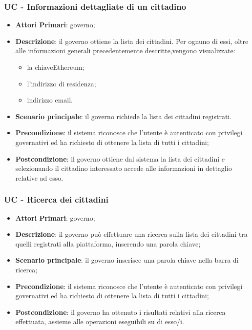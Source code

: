 \subsubsection{UC - Informazioni dettagliate di un cittadino}
\begin{itemize}
	\item \textbf{Attori Primari}: governo;
	\item \textbf{Descrizione}: il governo ottiene la lista dei cittadini. Per ognuno di essi, oltre alle informazioni generali precedentemente descritte,vengono visualizzate:
	\begin{itemize}
		\item la chiave\glosp Ethereum\glo;
		\item l'indirizzo di residenza;
		\item indirizzo email.
	\end{itemize}
	\item \textbf{Scenario principale}: il governo richiede la lista dei cittadini registrati.
	\item \textbf{Precondizione}: il sistema riconosce che l'utente è autenticato con privilegi governativi ed ha richiesto di ottenere la lista di tutti i cittadini;
	\item \textbf{Postcondizione}: il governo ottiene dal sistema la lista dei cittadini e selezionando il cittadino interessato accede alle informazioni in dettaglio relative ad esso.
\end{itemize}

\subsubsection{UC - Ricerca dei cittadini}
\begin{itemize}
	\item \textbf{Attori Primari}: governo;
	\item \textbf{Descrizione}:
	il governo può effettuare una ricerca sulla lista dei cittadini tra quelli registrati alla piattaforma, inserendo una parola chiave;
	\item \textbf{Scenario principale}: il governo inserisce una parola chiave nella barra di ricerca;
	\item \textbf{Precondizione}: il sistema riconosce che l'utente è autenticato con privilegi governativi ed ha richiesto di ottenere la lista di tutti i cittadini;
	\item \textbf{Postcondizione}:
	 il governo ha ottenuto i risultati relativi alla ricerca effettuata, assieme alle operazioni eseguibili su di esso/i.
\end{itemize}


